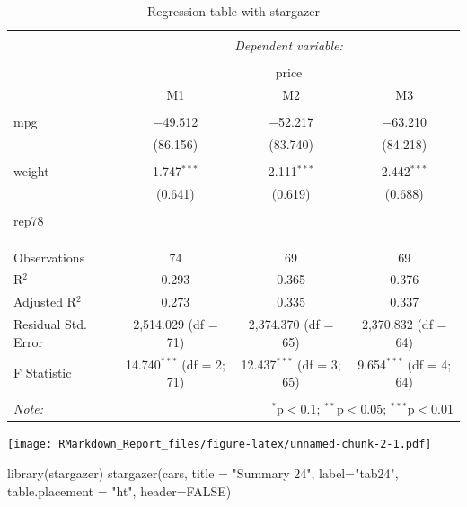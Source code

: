 \documentclass[
  12pt,
]{article}
\newenvironment{Shaded}{\begin{snugshade}}{\end{snugshade}}
\newcommand{\AttributeTok}[1]{\textcolor[rgb]{0.77,0.63,0.00}{#1}}
\newcommand{\ConstantTok}[1]{\textcolor[rgb]{0.00,0.00,0.00}{#1}}
\newcommand{\FunctionTok}[1]{\textcolor[rgb]{0.00,0.00,0.00}{#1}}
\newcommand{\NormalTok}[1]{#1}
\newcommand{\StringTok}[1]{\textcolor[rgb]{0.31,0.60,0.02}{#1}}
\begin{document}
\begin{table}[ht] \centering 
  \caption{Regression table with stargazer} 
  \label{tab3} 
\begin{tabular}{@{\extracolsep{5pt}}lccc} 
\\[-1.8ex]\hline 
\hline \\[-1.8ex] 
 & \multicolumn{3}{c}{\textit{Dependent variable:}} \\ 
\cline{2-4} 
\\[-1.8ex] & \multicolumn{3}{c}{price} \\ 
 & M1 & M2 & M3 \\ 
\hline \\[-1.8ex] 
 mpg & $-$49.512 & $-$52.217 & $-$63.210 \\ 
  & (86.156) & (83.740) & (84.218) \\ 
  & & & \\ 
 weight & 1.747$^{***}$ & 2.111$^{***}$ & 2.442$^{***}$ \\ 
  & (0.641) & (0.619) & (0.688) \\ 
  & & & \\ 
 rep78 &  &  &  \\ 
  &  &  &  \\ 
  & & & \\ 
\hline \\[-1.8ex] 
Observations & 74 & 69 & 69 \\ 
R$^{2}$ & 0.293 & 0.365 & 0.376 \\ 
Adjusted R$^{2}$ & 0.273 & 0.335 & 0.337 \\ 
Residual Std. Error & 2,514.029 (df = 71) & 2,374.370 (df = 65) & 2,370.832 (df = 64) \\ 
F Statistic & 14.740$^{***}$ (df = 2; 71) & 12.437$^{***}$ (df = 3; 65) & 9.654$^{***}$ (df = 4; 64) \\ 
\hline 
\hline \\[-1.8ex] 
\textit{Note:}  & \multicolumn{3}{r}{$^{*}$p$<$0.1; $^{**}$p$<$0.05; $^{***}$p$<$0.01} \\ 
\end{tabular} 
\end{table}

\texttt{[image: RMarkdown\_Report\_files/figure-latex/unnamed-chunk-2-1.pdf]}

\begin{Shaded}
\begin{Highlighting}[]
\FunctionTok{library}\NormalTok{(stargazer)}
\FunctionTok{stargazer}\NormalTok{(cars,}
          \AttributeTok{title =} \StringTok{"Summary 24"}\NormalTok{,}
          \AttributeTok{label=}\StringTok{"tab24"}\NormalTok{,}
          \AttributeTok{table.placement =} \StringTok{"ht"}\NormalTok{,}
          \AttributeTok{header=}\ConstantTok{FALSE}\NormalTok{)}
\end{Highlighting}
\end{Shaded}
\end{document}
